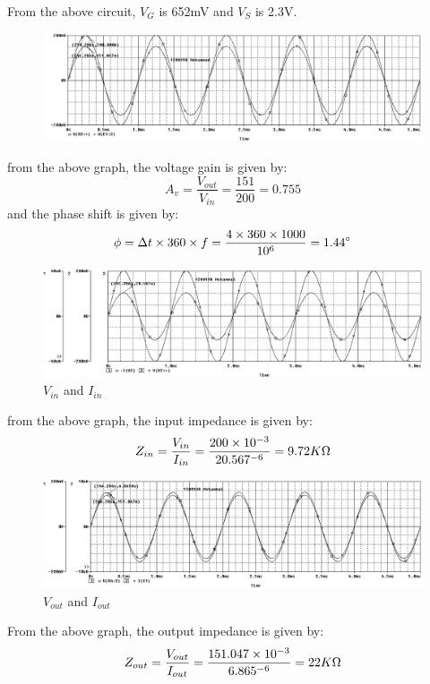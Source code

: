\documentclass[12pt]{article}
\begin{document}
From the above circuit, $V_G$ is 652mV and $V_S$ is 2.3V.
\begin{figure}[H]
    \centering
    \includegraphics[width=\textwidth]{assets/main/2023-08-19-00-15-23.png}
\end{figure}
from the above graph, the voltage gain is given by:
\begin{equation}
    A_v = \frac{V_{out}}{V_{in}} = \frac{151}{200} = 0.755
\end{equation}
and the phase shift is given by:
\begin{equation}
    \phi = \Delta t \times 360 \times f = {4 \times 360 \times 1000 \over 10^{6}} = 1.44^{\circ}
\end{equation}
\begin{figure}[H]
    \centering
    \includegraphics[width=\textwidth]{assets/main/2023-08-19-00-30-43.png}
    \caption{$V_{in}$ and $I_{in}$}
\end{figure}
from the above graph, the input impedance is given by:
\begin{equation}
    Z_{in} = \frac{V_{in}}{I_{in}} = \frac{200\times10^{-3}}{20.567 \time 10^{-6}} = 9.72K\Omega
\end{equation}
\begin{figure}[H]
    \centering
    \includegraphics[width=\textwidth]{assets/main/2023-08-19-00-42-46.png}
    \caption{$V_{out}$ and $I_{out}$}
\end{figure}
From the above graph, the output impedance is given by:
\begin{equation}
    Z_{out} = \frac{V_{out}}{I_{out}} = \frac{151.047 \times 10^{-3}}{6.865 \time 10^{-6}} =  22K\Omega     
\end{equation}
\end{document}
